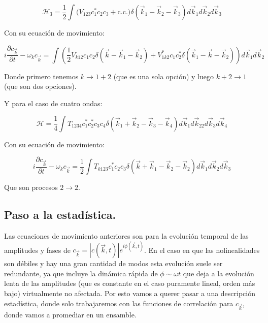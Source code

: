 \begin{equation}
	\mathcal{H}_3 = \frac{1}{2}\int \big(V_{123}c_1^*c_2c_3 + \text{c.c.}\big)\delta(\vec k_1-\vec k_2-\vec k_3)d\vec k_1 d\vec k_2 d\vec k_3
\end{equation}

Con su ecuación de movimiento:

\begin{equation}
	i\frac{\partial c_{\vec k}}{\partial t} - \omega_k c_{\vec k} = \int \left(\frac{1}{2}V_{k12}c_1c_2\delta(\vec k - \vec k_1 -\vec k_2) + V^*_{1k2}c_1c_2^*\delta(\vec k_1 -\vec k-\vec k_2)\right)d\vec k_1d\vec k_2
	\label{eq:motion_equation_three_waves}
\end{equation}

Donde primero tenemos $k\rightarrow1+2$ (que es una sola opción) y luego $k+2\rightarrow1$ (que son dos opciones).

Y para el caso de cuatro ondas:

\begin{equation}
	\mathcal{H} = \frac{1}{4}\int T_{1234}c_1^*c_2^*c_3c_4\delta(\vec k_1+\vec k_2-\vec k_3-\vec k_4)d\vec k_1 d\vec k_22 d\vec k_3 d\vec k_4
\end{equation}

Con su ecuación de movimiento:

\begin{equation}
	i\frac{\partial c_{\vec k}}{\partial t} - \omega_k c_{\vec k} = \frac{1}{2} \int T_{k123}c_1^*c_2c_3\delta(\vec k+\vec k_1-\vec k_2-\vec k_2) d\vec k_1 d\vec k_2d\vec k_3
\end{equation}

Que son procesos $2\rightarrow2$.

\subsection*{Paso a la estadística.}
Las ecuaciones de movimiento anteriores son para la evolución temporal de las amplitudes y fases de $c_{\vec k} = |c(\vec k, t)|e^{i\phi(\vec k, t)}$. En el caso en que las nolinealidades son débiles y hay una gran cantidad de modos esta evolución suele ser redundante, ya que incluye la dinámica rápida de $\phi\sim\omega t$ que deja a la evolución lenta de las amplitudes (que es constante en el caso puramente lineal, orden más bajo) virtualmente no afectada. Por esto vamos a querer pasar a una descripción estadística, donde solo trabajaremos con las funciones de correlación para $c_{\vec k}$, donde vamos a promediar en un ensamble.


